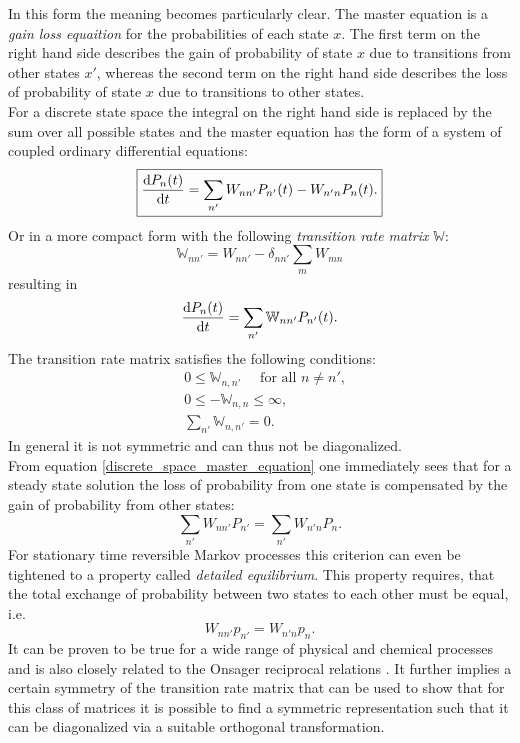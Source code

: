 In this form the meaning becomes particularly clear. The master equation is a \textit{gain loss equaition} for the probabilities of each state $x$. The first term on the right hand side describes the gain of probability of state $x$ due to transitions from other states $x'$, whereas the second term on the right hand side describes the loss of probability of state $x$ due to transitions to other states.\\
For a discrete state space the integral on the right hand side is replaced by the sum over all possible states and the master equation has the form of a system of coupled ordinary differential equations:
\begin{equation}
    \boxed{\frac{{\rm d} P_n(t)}{{\rm d} t} = \sum_{n'} W_{n n'}P_{n'}(t) - W_{n'n}P_{n}(t).}
    \label{discrete_space_master_equation}
\end{equation}
Or in a more compact form with the following \emph{transition rate matrix} $\mathbb{W}$:
\begin{equation}
    \mathbb{W}_{n n'} = W_{n n'} - \delta_{n n'}\sum\limits_{m} W_{m n}
    \label{transition_rate_matrix}
\end{equation}
resulting in 
\begin{equation}
    \frac{{\rm d} P_n(t)}{{\rm d} t} = \sum_{n'} \mathbb{W}_{n n'}P_{n'}(t).
    \label{ME3}
\end{equation}
The transition rate matrix satisfies the following conditions:
\begin{align*}
    &0 \le \mathbb{W}_{n,n'} \quad \mbox{ for all } n \ne n', \\
    &0 \le -\mathbb{W}_{n,n} \le \infty, \\
    &\sum_{n'} \mathbb{W}_{n,n'} = 0.
    \label{Transitions_rate_matrix}
\end{align*}
In general it is not symmetric and can thus not be diagonalized. \\
From equation \eqref{discrete_space_master_equation} one immediately sees that for a steady state solution the loss of probability from one state is compensated by the gain of probability from other states:\\
\begin{equation}
    \sum\limits_{n'} W_{n n'}P_{n'} = \sum\limits_{n'}W_{n' n} P_n.
    \label{equilibrium}
\end{equation}
For stationary time reversible Markov processes this criterion can even be tightened to a property called \textit{detailed equilibrium}.
This property requires, that the total exchange of probability between two states to each other must be equal, i.e.
\begin{equation}
   \boxed{ W_{n n'}p_{n'} = W_{n'n}p_{n}.}
    \label{detailed_balance}
\end{equation}
It can be proven to be true for a wide range of physical and chemical processes \cite{Boltzmann1872,Einstein1917,Wegscheider1911} and is also closely related to the Onsager reciprocal relations \cite{Onsager1931,Wigner1954}.
It further implies a certain symmetry of the transition rate matrix that can be used to show that for this class of matrices it is possible to find a symmetric representation such that it can be diagonalized via a suitable orthogonal transformation\cite{Oppenheim1977}.
